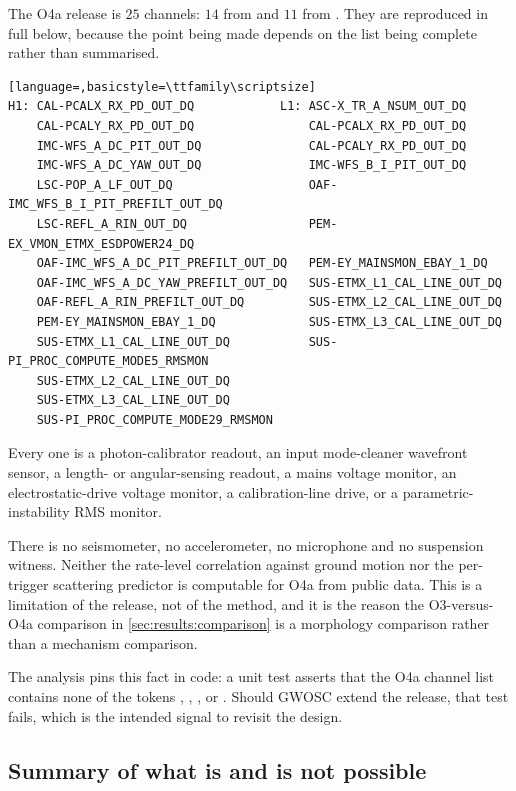 The O4a release \citep{GWOSCO4Aux} is $25$ channels: $14$ from \Hone{} and
$11$ from \Lone. They are reproduced in full below, because the point being
made depends on the list being complete rather than summarised.

\begin{lstlisting}[language=,basicstyle=\ttfamily\scriptsize]
H1: CAL-PCALX_RX_PD_OUT_DQ            L1: ASC-X_TR_A_NSUM_OUT_DQ
    CAL-PCALY_RX_PD_OUT_DQ                CAL-PCALX_RX_PD_OUT_DQ
    IMC-WFS_A_DC_PIT_OUT_DQ               CAL-PCALY_RX_PD_OUT_DQ
    IMC-WFS_A_DC_YAW_OUT_DQ               IMC-WFS_B_I_PIT_OUT_DQ
    LSC-POP_A_LF_OUT_DQ                   OAF-IMC_WFS_B_I_PIT_PREFILT_OUT_DQ
    LSC-REFL_A_RIN_OUT_DQ                 PEM-EX_VMON_ETMX_ESDPOWER24_DQ
    OAF-IMC_WFS_A_DC_PIT_PREFILT_OUT_DQ   PEM-EY_MAINSMON_EBAY_1_DQ
    OAF-IMC_WFS_A_DC_YAW_PREFILT_OUT_DQ   SUS-ETMX_L1_CAL_LINE_OUT_DQ
    OAF-REFL_A_RIN_PREFILT_OUT_DQ         SUS-ETMX_L2_CAL_LINE_OUT_DQ
    PEM-EY_MAINSMON_EBAY_1_DQ             SUS-ETMX_L3_CAL_LINE_OUT_DQ
    SUS-ETMX_L1_CAL_LINE_OUT_DQ           SUS-PI_PROC_COMPUTE_MODE5_RMSMON
    SUS-ETMX_L2_CAL_LINE_OUT_DQ
    SUS-ETMX_L3_CAL_LINE_OUT_DQ
    SUS-PI_PROC_COMPUTE_MODE29_RMSMON
\end{lstlisting}

Every one is a photon-calibrator readout, an input mode-cleaner wavefront
sensor, a length- or angular-sensing readout, a mains voltage monitor, an
electrostatic-drive voltage monitor, a calibration-line drive, or a
parametric-instability RMS monitor.

There is no seismometer, no accelerometer, no microphone and no suspension
witness. Neither the rate-level correlation against ground motion nor the
per-trigger scattering predictor is computable for O4a from public data. This
is a limitation of the release, not of the method, and it is the reason the
O3-versus-O4a comparison in \cref{sec:results:comparison} is a morphology
comparison rather than a mechanism comparison.

The analysis pins this fact in code: a unit test asserts that the O4a channel
list contains none of the tokens , ,
,  or . Should GWOSC extend the
release, that test fails, which is the intended signal to revisit the design.

\subsection{Summary of what is and is not possible}

